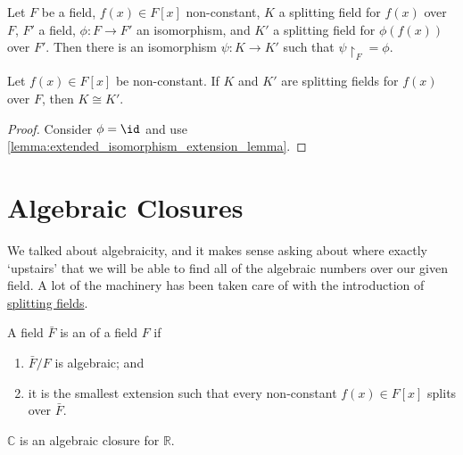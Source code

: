 \documentclass[notoc,notitlepage,nobib]{tufte-book}
\begin{document}
\begin{lemma}\label{lemma:extended_isomorphism_extension_lemma}
  Let $F$ be a field, $f(x) \in F[x]$ non-constant, $K$ a splitting field for $f(x)$ over $F$,
  $F'$ a field, $\phi : F \to F'$ an isomorphism, and $K'$ a splitting field for $\phi(f(x))$
  over $F'$. Then there is an isomorphism $\psi : K \to K'$ such that $\psi \restriction_F = \phi$.
\end{lemma}

\begin{crly}\label{crly:splitting_fields_are_unique_up_to_isomorphism}
  Let $f(x) \in F[x]$ be non-constant. If $K$ and $K'$ are splitting fields for $f(x)$ over $F$,
  then $K \cong K'$.
\end{crly}

\begin{proof}
  Consider $\phi = \id$ and use \cref{lemma:extended_isomorphism_extension_lemma}.
\end{proof}


\section{Algebraic Closures}%
\label{sec:algebraic_closures}

We talked about algebraicity, and it makes sense asking about where exactly `upstairs' that
we will be able to find all of the algebraic numbers over our given field. A lot of the
machinery has been taken care of with the introduction of 
\hyperref[sec:splitting_fields]{splitting fields}.

\begin{defn}\label{defn:algebraic_closures}
  A field $\bar{F}$ is an  of a field $F$ if
  \begin{enumerate}
    \item $\bar{F} / F$ is algebraic; and
    \item it is the smallest extension such that every non-constant $f(x) \in
      F[x]$ splits over $\bar{F}$.
  \end{enumerate}
\end{defn}

\begin{eg}
  $\mathbb{C}$ is an algebraic closure for $\mathbb{R}$.
\end{eg}
\end{document}
